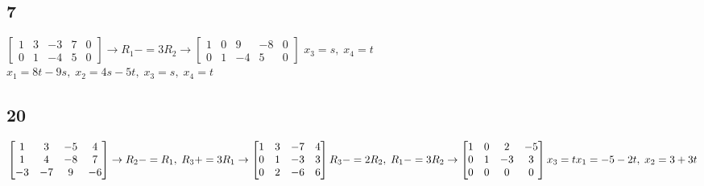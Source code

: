\documentclass{article}
\begin{document}
\subsection*{7}
$\begin{bmatrix}
    1&3&-3&7&0\\0&1&-4&5&0
\end{bmatrix}\rightarrow R_1-=3R_2 \rightarrow \begin{bmatrix}
    1&0&9&-8&0\\0&1&-4&5&0
\end{bmatrix}$  $x_3=s,\; x_4=t$
\\[0.1in]$x_1=8t-9s,\;x_2=4s-5t,\;x_3=s,\;x_4=t$
\subsection*{20}
$\begin{bmatrix}1&3&-5&4\\1&4&-8&7\\-3&-7&9&-6\end{bmatrix}\rightarrow R_2-=R_1,\;R_3+=3R_1\rightarrow\begin{bmatrix}1&3&-7&4 \\ 0&1&-3&3\\ 0&2&-6&6\end{bmatrix}\\R_3-=2R_2,\;R_1-=3R_2 \rightarrow \begin{bmatrix}1&0&2&-5\\0&1&-3&3\\0&0&0&0\end{bmatrix} x_3=t
\\[0.1in]x_1=-5-2t,\;x_2=3+3t$ 
\end{document}
